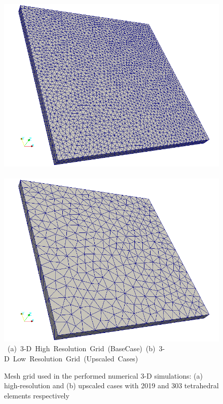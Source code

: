 \begin{figure}[ht] 
\vbox{\vspace{-1cm}
\hbox{\includegraphics[width=.56\textwidth]{./Pics/3D_BaseCase/3D_BaseCase_MeshOnly.png}
      \includegraphics[width=.56\textwidth]{./Pics/3D_HOSVDCase/3D_HOSVDCase_MeshOnly.png}}
\vspace{0.cm}
\hbox{\hspace{0.05cm} (a) 3-D High Resolution Grid (BaseCase) \hspace{0.05cm} (b) 3-D Low Resolution Grid (Upscaled Cases) \hspace{3.0cm}}
\vspace{0.5cm}
}   
\caption{Mesh grid used in the performed numerical 3-D simulations: (a) high-resolution and (b) upscaled cases with 2019 and 303 tetrahedral elements respectively}
\label{fig:HiRes_LowRes_3D_Mesh}
\end{figure}


\clearpage

